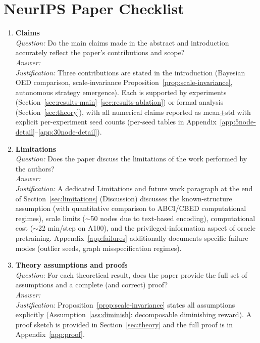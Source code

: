 
\section*{NeurIPS Paper Checklist}

\begin{enumerate}

\item \textbf{Claims}\\
\emph{Question:} Do the main claims made in the abstract and introduction accurately reflect the paper's contributions and scope?\\
\emph{Answer:} \answerYes{}\\
\emph{Justification:} Three contributions are stated in the introduction (Bayesian OED comparison, scale-invariance Proposition~\ref{prop:scale-invariance}, autonomous strategy emergence). Each is supported by experiments (Section~\ref{sec:results-main}--\ref{sec:results-ablation}) or formal analysis (Section~\ref{sec:theory}), with all numerical claims reported as mean$\pm$std with explicit per-experiment seed counts (per-seed tables in Appendix~\ref{app:5node-detail}--\ref{app:30node-detail}).

\item \textbf{Limitations}\\
\emph{Question:} Does the paper discuss the limitations of the work performed by the authors?\\
\emph{Answer:} \answerYes{}\\
\emph{Justification:} A dedicated Limitations and future work paragraph at the end of Section~\ref{sec:limitations} (Discussion) discusses the known-structure assumption (with quantitative comparison to ABCI/CBED computational regimes), scale limits ($\sim$50 nodes due to text-based encoding), computational cost ($\sim$22 min/step on A100), and the privileged-information aspect of oracle pretraining. Appendix~\ref{app:failures} additionally documents specific failure modes (outlier seeds, graph misspecification regimes).

\item \textbf{Theory assumptions and proofs}\\
\emph{Question:} For each theoretical result, does the paper provide the full set of assumptions and a complete (and correct) proof?\\
\emph{Answer:} \answerYes{}\\
\emph{Justification:} Proposition~\ref{prop:scale-invariance} states all assumptions explicitly (Assumption~\ref{ass:diminish}: decomposable diminishing reward). A proof sketch is provided in Section~\ref{sec:theory} and the full proof is in Appendix~\ref{app:proof}.


\end{enumerate}
